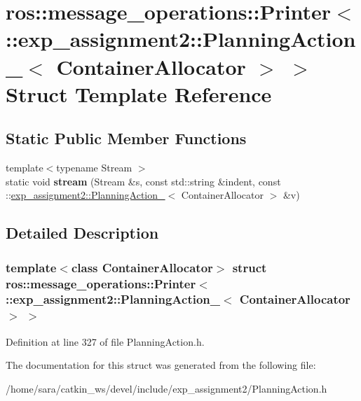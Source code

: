 \hypertarget{structros_1_1message__operations_1_1Printer_3_01_1_1exp__assignment2_1_1PlanningAction___3_01ContainerAllocator_01_4_01_4}{}\section{ros\+:\+:message\+\_\+operations\+:\+:Printer$<$ \+:\+:exp\+\_\+assignment2\+:\+:Planning\+Action\+\_\+$<$ Container\+Allocator $>$ $>$ Struct Template Reference}
\label{structros_1_1message__operations_1_1Printer_3_01_1_1exp__assignment2_1_1PlanningAction___3_01ContainerAllocator_01_4_01_4}
\subsection*{Static Public Member Functions}
\begin{DoxyCompactItemize}
\item 
\mbox{\label{structros_1_1message__operations_1_1Printer_3_01_1_1exp__assignment2_1_1PlanningAction___3_01ContainerAllocator_01_4_01_4_a5f11b960db9fe394845b4a6736e01cf2}} 
{\footnotesize template$<$typename Stream $>$ }\\static void {\bfseries stream} (Stream \&s, const std\+::string \&indent, const \+::\hyperlink{structexp__assignment2_1_1PlanningAction__}{exp\+\_\+assignment2\+::\+Planning\+Action\+\_\+}$<$ Container\+Allocator $>$ \&v)
\end{DoxyCompactItemize}


\subsection{Detailed Description}
\subsubsection*{template$<$class Container\+Allocator$>$\newline
struct ros\+::message\+\_\+operations\+::\+Printer$<$ \+::exp\+\_\+assignment2\+::\+Planning\+Action\+\_\+$<$ Container\+Allocator $>$ $>$}



Definition at line 327 of file Planning\+Action.\+h.



The documentation for this struct was generated from the following file\+:\begin{DoxyCompactItemize}
\item 
/home/sara/catkin\+\_\+ws/devel/include/exp\+\_\+assignment2/Planning\+Action.\+h\end{DoxyCompactItemize}
